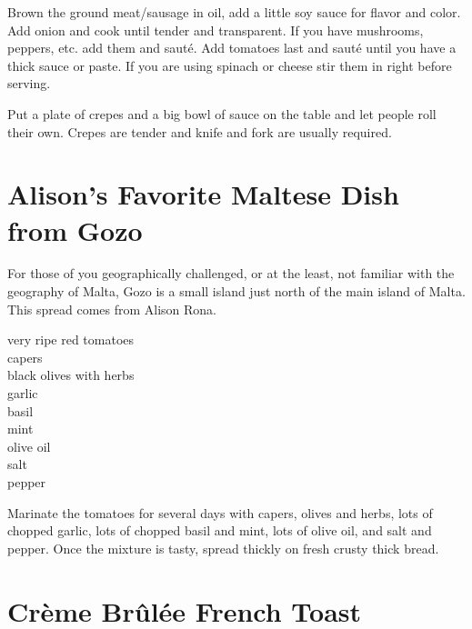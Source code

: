 Brown the ground meat/sausage in oil, add a little soy sauce for flavor and
color. Add onion and cook until tender and transparent. If you have mushrooms,
peppers, etc. add them and saut\'{e}. Add tomatoes last and saut\'{e} until you
have a thick sauce or paste. If you are using spinach or cheese stir them in
right before serving.

Put a plate of crepes and a big bowl of sauce on the table and let people roll
their own. Crepes are tender and knife and fork are usually required.

\section{Alison's Favorite Maltese Dish from Gozo}

\begin{open}
    For those of you geographically challenged, or at the least, not familiar with the geography of Malta, Gozo is a small island just north of the main island of Malta.  This spread comes from Alison Rona.
\end{open}
\begin{ingredients}
    very ripe red tomatoes\\
    capers\\
    black olives with herbs\\
    garlic\\
    basil\\
    mint\\
    olive oil\\
    salt\\
    pepper
\end{ingredients}
Marinate the tomatoes for several days with capers, olives and herbs, lots of chopped garlic, lots of chopped basil and mint, lots of olive oil, and salt and pepper.  Once the mixture is tasty, spread thickly on fresh crusty thick bread.

\section{Cr\`eme Br\^ul\'ee French Toast}

